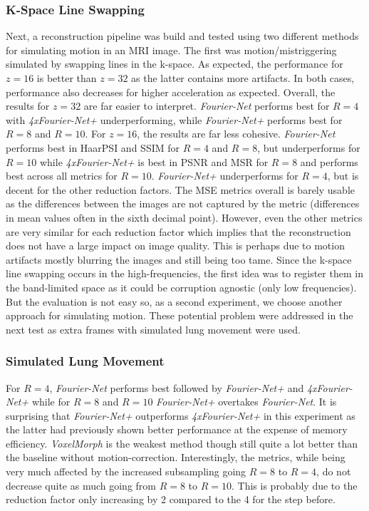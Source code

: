 \subsubsection{K-Space Line Swapping}
Next, a reconstruction pipeline was build and tested using two different methods for simulating motion in an MRI image. The first was motion/mistriggering simulated by swapping lines in the k-space. As expected, the performance for $z=16$ is better than $z=32$ as the latter contains more artifacts. In both cases, performance also decreases for higher acceleration as expected. Overall, the results for $z=32$ are far easier to interpret. \emph{Fourier-Net} performs best for $R=4$ with \emph{4xFourier-Net+} underperforming, while \emph{Fourier-Net+} performs best for $R=8$ and $R=10$. For $z=16$, the results are far less cohesive. \emph{Fourier-Net} performs best in HaarPSI and SSIM for $R=4$ and $R=8$, but underperforms for $R=10$ while \emph{4xFourier-Net+} is best in PSNR and MSR for $R=8$ and performs best across all metrics for $R=10$. \emph{Fourier-Net+} underperforms for $R=4$, but is decent for the other reduction factors. The MSE metrics overall is barely usable as the differences between the images are not captured by the metric (differences in mean values often in the sixth decimal point). However, even the other metrics are very similar for each reduction factor which implies that the reconstruction does not have a large impact on image quality. This is perhaps due to motion artifacts mostly blurring the images and still being too tame. Since the k-space line swapping occurs in the high-frequencies, the first idea was to register them in the band-limited space as it could be corruption agnostic (only low frequencies). But the evaluation is not easy so, as a second experiment, we choose another approach for simulating motion. These potential problem were addressed in the next test as extra frames with simulated lung movement were used.

\subsubsection{Simulated Lung Movement}
For $R=4$, \emph{Fourier-Net} performs best followed by \emph{Fourier-Net+} and \emph{4xFourier-Net+} while for $R=8$ and $R=10$ \emph{Fourier-Net+} overtakes \emph{Fourier-Net}. It is surprising that \emph{Fourier-Net+} outperforms \emph{4xFourier-Net+} in this experiment as the latter had previously shown better performance at the expense of memory efficiency. \emph{VoxelMorph} is the weakest method though still quite a lot better than the baseline without motion-correction. Interestingly, the metrics, while being very much affected by the increased subsampling going $R=8$ to $R=4$, do not decrease quite as much going from $R=8$ to $R=10$. This is probably due to the reduction factor only increasing by 2 compared to the 4 for the step before. 

